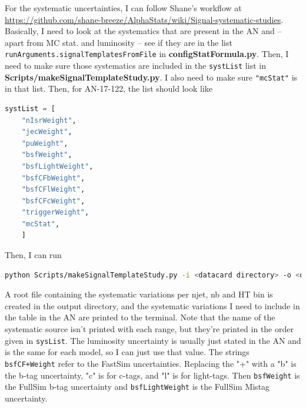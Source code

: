 For the systematic uncertainties, I can follow Shane's workflow at \url{https://github.com/shane-breeze/AlphaStats/wiki/Signal-systematic-studies}. Basically, I need to look at the systematics that are present in the AN and -- apart from MC stat. and luminosity -- see if they are in the list \texttt{runArguments.signalTemplatesFromFile} in \textbf{configStatFormula.py}. Then, I need to make sure those systematics are included in the \texttt{systList} list in \textbf{Scripts/makeSignalTemplateStudy.py}. I also need to make sure \texttt{"mcStat"} is in that list. Then, for AN-17-122, the list should look like

\begin{lstlisting}[belowskip=-0.7cm, language=python, numbers=none]
systList = [
    "nIsrWeight",
    "jecWeight",
    "puWeight",
    "bsfWeight",
    "bsfLightWeight",
    "bsfCFbWeight",
    "bsfCFlWeight",
    "bsfCFcWeight",
    "triggerWeight",
    "mcStat",
    ]
\end{lstlisting}

Then, I can run

\begin{lstlisting}[belowskip=-0.7cm, language=sh, numbers=none]
python Scripts/makeSignalTemplateStudy.py -i <datacard directory> -o <output directory> --filters <bechmark model>
\end{lstlisting}

A root file containing the systematic variations per njet, nb and HT bin is created in the output directory, and the systematic variations I need to include in the table in the AN are printed to the terminal. Note that the name of the systematic source isn't printed with each range, but they're printed in the order given in \texttt{sysList}. The luminosity uncertainty is usually just stated in the AN and is the same for each model, so I can just use that value. The strings \texttt{bsfCF+Weight} refer to the FastSim uncertainties. Replacing the "+" with a "b" is the b-tag uncertainty, "c" is for c-tags, and "l" is for light-tags. Then \texttt{bsfWeight} is the FullSim b-tag uncertainty and \texttt{bsfLightWeight} is the FullSim Mistag uncertainty.

